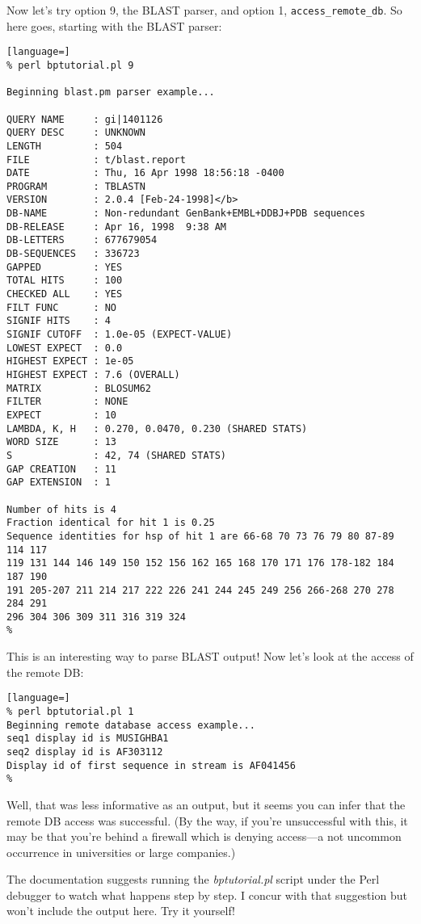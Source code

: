 Now let's try option 9, the BLAST parser, and option 1, \verb|access_remote_db|. So here goes, starting with the BLAST parser: 

\begin{lstlisting}[language=]
% perl bptutorial.pl 9

Beginning blast.pm parser example... 

QUERY NAME     : gi|1401126
QUERY DESC     : UNKNOWN
LENGTH         : 504
FILE           : t/blast.report
DATE           : Thu, 16 Apr 1998 18:56:18 -0400
PROGRAM        : TBLASTN
VERSION        : 2.0.4 [Feb-24-1998]</b>
DB-NAME        : Non-redundant GenBank+EMBL+DDBJ+PDB sequences
DB-RELEASE     : Apr 16, 1998  9:38 AM
DB-LETTERS     : 677679054
DB-SEQUENCES   : 336723
GAPPED         : YES
TOTAL HITS     : 100
CHECKED ALL    : YES
FILT FUNC      : NO
SIGNIF HITS    : 4
SIGNIF CUTOFF  : 1.0e-05 (EXPECT-VALUE)
LOWEST EXPECT  : 0.0
HIGHEST EXPECT : 1e-05
HIGHEST EXPECT : 7.6 (OVERALL)
MATRIX         : BLOSUM62
FILTER         : NONE
EXPECT         : 10
LAMBDA, K, H   : 0.270, 0.0470, 0.230 (SHARED STATS)
WORD SIZE      : 13
S              : 42, 74 (SHARED STATS)
GAP CREATION   : 11
GAP EXTENSION  : 1

Number of hits is 4 
Fraction identical for hit 1 is 0.25 
Sequence identities for hsp of hit 1 are 66-68 70 73 76 79 80 87-89 114 117
119 131 144 146 149 150 152 156 162 165 168 170 171 176 178-182 184 187 190
191 205-207 211 214 217 222 226 241 244 245 249 256 266-268 270 278 284 291
296 304 306 309 311 316 319 324 
%
\end{lstlisting}

This is an interesting way to parse BLAST output! Now let's look at the access of the remote DB: 

\begin{lstlisting}[language=]
% perl bptutorial.pl 1
Beginning remote database access example... 
seq1 display id is MUSIGHBA1 
seq2 display id is AF303112 
Display id of first sequence in stream is AF041456
% 
\end{lstlisting}

Well, that was less informative as an output, but it seems you can infer that the remote DB access was successful. (By the way, if you're unsuccessful with this, it may be that you're behind a firewall which is denying access—a not uncommon occurrence in universities or large companies.)

The documentation suggests running the \textit{bptutorial.pl} script under the Perl debugger to watch what happens step by step. I concur with that suggestion but won't include the output here. Try it yourself!

